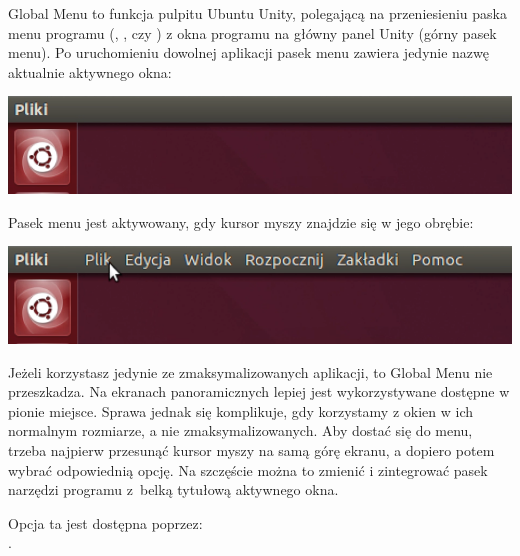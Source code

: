 Global Menu to funkcja pulpitu Ubuntu Unity, polegającą na przeniesieniu paska menu programu (, , czy ) z okna programu na główny panel Unity (górny pasek menu). Po uruchomieniu dowolnej aplikacji pasek menu zawiera jedynie nazwę aktualnie aktywnego okna:

\begin{center}
	\includegraphics[width=\linewidth]{images/unity_menu_bar2.png}
\end{center}

Pasek menu jest aktywowany, gdy kursor myszy znajdzie się w jego obrębie:

\begin{center}
	\includegraphics[width=\linewidth]{images/unity_menu_bar3.png}
\end{center}

Jeżeli korzystasz jedynie ze zmaksymalizowanych aplikacji, to Global Menu nie przeszkadza. Na ekranach panoramicznych lepiej jest wykorzystywane dostępne w pionie miejsce. Sprawa jednak się komplikuje, gdy korzystamy z okien w ich normalnym rozmiarze, a nie zmaksymalizowanych. Aby dostać się do menu, trzeba najpierw przesunąć kursor myszy na samą górę ekranu, a dopiero potem wybrać odpowiednią opcję. Na szczęście można to zmienić i zintegrować pasek narzędzi programu z~belką tytułową aktywnego okna. 

Opcja ta jest dostępna poprzez:\\
\noindent {}.
